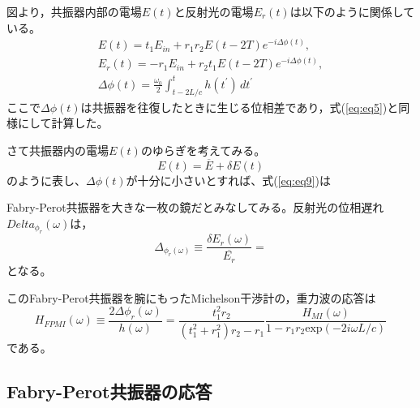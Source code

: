図より，共振器内部の電場$E(t)$と反射光の電場$E_{r}(t)$は以下のように関係している。
\begin{eqnarray}
  E(t) = t_{1}E_{in} + r_{1}r_{2}E(t-2T)e^{-i\Delta{\phi(t)}}, \\\label{eq:eq9}
  E_{r}(t) = -r_{1}E_{in} + r_{2}t_{1}E(t-2T)e^{-i\Delta{\phi(t)}},\\\label{eq:eq10}
  \Delta\phi(t) = \frac{\omega_{0}}{2}\int_{t-2L/c}^{t} h(t^{\prime})\, dt^{\prime} \label{eq:eq11}
\end{eqnarray}
ここで$\Delta{\phi(t)}$は共振器を往復したときに生じる位相差であり，式(\ref{eq:eq5})と同様にして計算した。


さて共振器内の電場$E(t)$のゆらぎを考えてみる。
\begin{equation}
  E(t) = \overline{E} + \delta{E(t)}
\end{equation}
のように表し、$\Delta\phi(t)$が十分に小さいとすれば、式(\ref{eq:eq9})は
\begin{equation}
\boxed{}
\end{equation}



Fabry-Perot共振器を大きな一枚の鏡だとみなしてみる。反射光の位相遅れ$Delta_{\phi_{r}}(\omega)$は，
\begin{equation}
\Delta_{\phi_{r}(\omega)} \equiv \frac{\delta{E_{r}}(\omega)}{\overline{E_{r}}} = 
\end{equation}
となる。


このFabry-Perot共振器を腕にもったMichelson干渉計の，重力波の応答は
\begin{equation}
\boxed{H_{FPMI}(\omega) \equiv \frac{2\Delta{\phi_{r}(\omega)}}{h(\omega)} = \frac{t_{1}^{2}r_{2}}{(t_{1}^{2}+r_{1}^{2})r_{2}-r_{1}}\frac{H_{MI}(\omega)}{1-r_{1}r_{2}\mathrm{exp}(-2i\omega{L}/c)}}
\end{equation}
である。

\subsection{Fabry-Perot共振器の応答}
